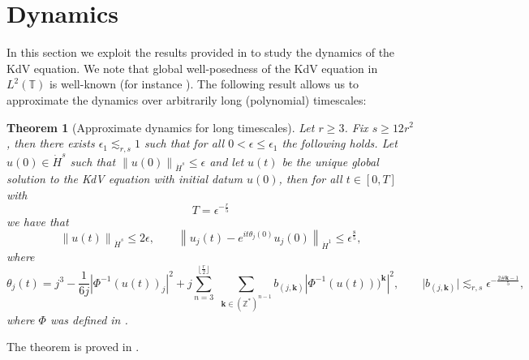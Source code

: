 \documentclass[a4paper,10pt,reqno]{article}
\theoremstyle{definition}
\theoremstyle{plain}
\newtheorem{theorem}[definition]{Theorem}
\theoremstyle{plain}
\theoremstyle{definition}
\theoremstyle{plain}
\theoremstyle{plain}
\theoremstyle{plain}
\theoremstyle{definition}
\theoremstyle{definition}
\newcommand{\norm}[1]{\left\lVert #1 \right\rVert}
\def \Z{\mathbb Z}
\def \T{\mathbb{T}}
\def \k{\bm{k}}
\begin{document}
\medskip

\section{Dynamics} \label{subsection: dynamics}

In this section we exploit the results provided in  to study the dynamics of the KdV equation. We note that global well-posedness of the KdV equation in $L^2 (\T)$ 
    is well-known (for instance \cite[Chapter 3]{erdogan}).
The following result allows us to approximate the dynamics over arbitrarily long (polynomial) timescales:

\begin{theorem}[Approximate dynamics for long timescales] \label{teorema: approssimazione con fasi lineari in t - con eps}
Let $r \ge 3$. 
Fix $s \ge 12 r^2$, then there exists $\epsilon_1 \lesssim_{r,s} 1$ such that for all $0<\epsilon\leq \epsilon_1$ the following holds. Let $u(0) \in \dot{H}^s$ such that 
$\norm{u(0)}_{\dot{H}^s} \le \epsilon$
and let $u(t)$ be the unique global solution to the KdV equation with initial datum $u(0)$, then for all $t \in [0,T]$ with
\begin{equation}
T = \epsilon^{-\frac{r}{5}}
\label{eq: timescales}
\end{equation}
we have that
\begin{equation}\label{eq: approx fasi lineari}
\norm{u(t)}_{\dot{H}^s} \le 2 \epsilon, \qquad \norm{u_j(t)-e^{i t \theta_j(0)}u_j(0)}_{\dot{H}^1} \le \epsilon^{\frac{8}{5}}, 
\end{equation}
where 
\begin{equation}
\theta_j(t) = j^3 - \frac{1}{6j} |\Phi^{-1}(u(t))_j|^2 + j \sum_{n=3}^{\lfloor \frac{r}{2} \rfloor} \, \, \sum_{\k \in (\Z^*)^{n-1}} b_{(j,\k)} |\Phi^{-1}(u(t)))^{\k}|^2, \qquad \lvert b_{(j,\k)} \rvert \lesssim_{r,s} \epsilon^{-\frac{2\#\k-1}{5}},
\label{def: phases 1}
\end{equation}
where $\Phi$ was defined in .
\end{theorem}

The theorem is proved in .
\end{document}
